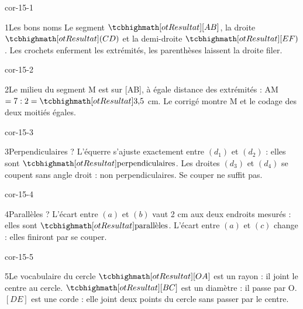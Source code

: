 \clearpage\pagestyle{otMain}\setlength{\otBlocEspacement}{2.5mm}\fontsize{11}{15}\selectfont{}
\begin{blocLivre}{cor-15-1}\begin{corrige}{1}{Les bons noms}
Le segment $\res{[AB]}$, la droite $\res{(CD)}$ et la demi-droite $\res{[EF)}$. Les crochets enferment les extrémités, les parenthèses laissent la droite filer.
\label{fig-cor-15-1}
\end{corrige}\end{blocLivre}
\begin{blocLivre}{cor-15-2}\begin{corrige}{2}{Le milieu du segment}
M est sur [AB], à égale distance des extrémités : AM $=7:2=\res{3{,}5}$ cm. Le corrigé montre M et le codage des deux moitiés égales.
\label{fig-cor-15-2}
\end{corrige}\end{blocLivre}
\begin{blocLivre}{cor-15-3}\begin{corrige}{3}{Perpendiculaires ?}
L’équerre s’ajuste exactement entre $(d_1)$ et $(d_2)$ : elles sont $\res{\text{perpendiculaires}}$. Les droites $(d_3)$ et $(d_4)$ se coupent sans angle droit : non perpendiculaires. Se couper ne suffit pas.
\label{fig-cor-15-3}
\end{corrige}\end{blocLivre}
\begin{blocLivre}{cor-15-4}\begin{corrige}{4}{Parallèles ?}
L’écart entre $(a)$ et $(b)$ vaut 2 cm aux deux endroits mesurés : elles sont $\res{\text{parallèles}}$. L’écart entre $(a)$ et $(c)$ change : elles finiront par se couper.
\label{fig-cor-15-4}
\end{corrige}\end{blocLivre}
\begin{blocLivre}{cor-15-5}\begin{corrige}{5}{Le vocabulaire du cercle}
$\res{[OA]}$ est un rayon : il joint le centre au cercle. $\res{[BC]}$ est un diamètre : il passe par O. $[DE]$ est une corde : elle joint deux points du cercle sans passer par le centre.
\label{fig-cor-15-5}
\end{corrige}\end{blocLivre}
